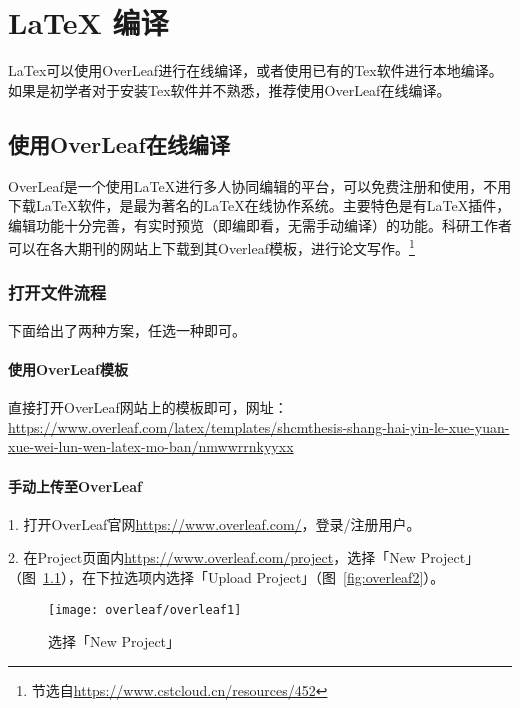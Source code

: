 
\chapter{\LaTeX{} 编译}

LaTex可以使用OverLeaf进行在线编译，或者使用已有的Tex软件进行本地编译。如果是初学者对于安装Tex软件并不熟悉，推荐使用OverLeaf在线编译。

\section{使用OverLeaf在线编译}

OverLeaf是一个使用LaTeX进行多人协同编辑的平台，可以免费注册和使用，不用下载LaTeX软件，是最为著名的LaTeX在线协作系统。主要特色是有LaTeX插件，编辑功能十分完善，有实时预览（即编即看，无需手动编译）的功能。科研工作者可以在各大期刊的网站上下载到其Overleaf模板，进行论文写作。\footnote{节选自\url{https://www.cstcloud.cn/resources/452}}

\subsection{打开文件流程}

下面给出了两种方案，任选一种即可。

\subsubsection{使用OverLeaf模板}

直接打开OverLeaf网站上的模板即可，网址：\url{https://www.overleaf.com/latex/templates/shcmthesis-shang-hai-yin-le-xue-yuan-xue-wei-lun-wen-latex-mo-ban/nmwwrrnkyyxx}

\subsubsection{手动上传至OverLeaf}

1. 打开OverLeaf官网\url{https://www.overleaf.com/}，登录/注册用户。

2. 在Project页面内\url{https://www.overleaf.com/project}，选择「New Project」（图~\ref{fig:overleaf1}），在下拉选项内选择「Upload Project」（图~\ref{fig:overleaf2}）。

\begin{figure}
	\centering
	\texttt{[image: overleaf/overleaf1]}
	\caption{选择「New Project」}
	\label{fig:overleaf1}
\end{figure}

